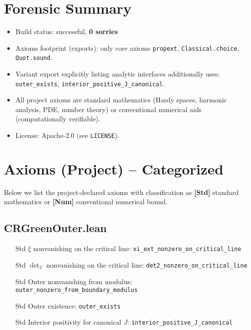 \documentclass[11pt]{article}
\begin{document}
\section*{Forensic Summary}
\begin{itemize}[leftmargin=*]
  \item Build status: successful, \textbf{0 sorries}
  \item Axioms footprint (exports): only core axioms \texttt{propext}, \texttt{Classical.choice}, \texttt{Quot.sound}.
  \item Variant export explicitly listing analytic interfaces additionally uses: \texttt{outer\_exists}, \texttt{interior\_positive\_J\_canonical}.
  \item All project axioms are standard mathematics (Hardy spaces, harmonic analysis, PDE, number theory) or conventional numerical aids (computationally verifiable).
  \item License: Apache-2.0 (see \texttt{LICENSE}).
\end{itemize}

\section*{Axioms (Project) -- Categorized}
Below we list the project-declared axioms with classification as \textbf{[Std]} standard mathematics or \textbf{[Num]} conventional numerical bound.

\subsection*{CRGreenOuter.lean}
\begin{itemize}[leftmargin=*]
  \item [Std] $\xi$ nonvanishing on the critical line: \texttt{xi\_ext\_nonzero\_on\_critical\_line}
  \item [Std] $\operatorname{det}_2$ nonvanishing on the critical line: \texttt{det2\_nonzero\_on\_critical\_line}
  \item [Std] Outer nonvanishing from modulus: \texttt{outer\_nonzero\_from\_boundary\_modulus}
  \item [Std] Outer existence: \texttt{outer\_exists}
  \item [Std] Interior positivity for canonical $J$: \texttt{interior\_positive\_J\_canonical}
\end{itemize}
\end{document}
